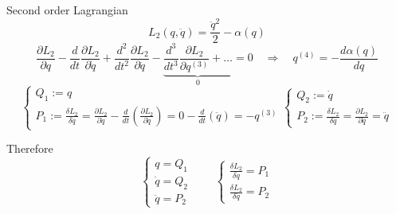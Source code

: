\documentclass[10pt]{beamer}
\begin{document}
  \begin{frame}{Second order Lagrangian}
    \begin{equation*}
      L_2(q, \ddot{q}) = \frac{\ddot{q}^2}{2} - \alpha(q)
    \end{equation*}
    \vspace{0.2em}
    \begin{equation*} \label{eq: second-order_motion_eq_lagr}
      \frac{\partial L_2}{\partial q} -
      \frac{d}{dt}\frac{\partial L_2}{\partial \dot{q}} +
      \frac{d^2}{dt^2}\frac{\partial L_2}{\partial \ddot{q}} -
      \underbrace{
        \frac{d^3}{dt^3}\frac{\partial L_2}{\partial q^{(3)}} + \ldots
      }_0 = 0
      \quad \Rightarrow \quad
      q^{(4)} = - \frac{d\alpha(q)}{dq}
    \end{equation*}
    \begin{equation*}
      \begin{cases}
        Q_1 := q \\
        P_1 := \frac{\delta L_2}{\delta \dot{q}}
             = \frac{\partial L_2}{\partial \dot{q}} -
               \frac{d}{dt} \left( \frac{\partial L_2}{\partial \ddot{q}} \right)
             = 0 - \frac{d}{dt} \left( \ddot{q} \right) = -q^{(3)}
      \end{cases}
      \begin{cases}
        Q_2 := \dot{q} \\
        P_2 := \frac{\delta L_2}{\delta \ddot{q}}
             = \frac{\partial L_2}{\partial \ddot{q}} = \ddot{q}
      \end{cases}
    \end{equation*}

    Therefore
    \begin{equation*}
      \begin{cases}
        q        = Q_1 \\
        \dot{q}  = Q_2 \\
        \ddot{q} = P_2
      \end{cases}
      \qquad
      \begin{cases}
        \frac{\delta L_2}{\delta \dot{q}}  = P_1 \\
        \frac{\delta L_2}{\delta \ddot{q}} = P_2
      \end{cases}
    \end{equation*}
  \end{frame}
\end{document}
